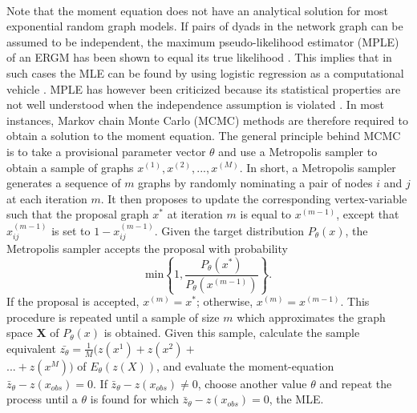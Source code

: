 \documentclass[a4paper, man, floatsintext]{apa6}
\begin{document}
\\
Note that the moment equation does not have an analytical solution for most exponential random graph models. If pairs of dyads in the network graph can be assumed to be independent, the maximum pseudo-likelihood estimator (MPLE) of an ERGM has been shown to equal its true likelihood \cite{hunter2008ergm}. This implies that in such cases the MLE can be found by using logistic regression as a computational vehicle \cite{hunter2008ergm}. MPLE has however been criticized because its statistical properties are not well understood when the independence assumption is violated \cite{van2009framework}. In most instances, Markov chain Monte Carlo (MCMC) methods are therefore required to obtain a solution to the moment equation. The general principle behind MCMC is to take a provisional parameter vector $\theta$ and use a Metropolis sampler to obtain a sample of graphs $x^{(1)}, x^{(2)}, ..., x^{(M)}$. In short, a Metropolis sampler generates a sequence of $m$ graphs by randomly nominating a pair of nodes $i$ and $j$ at each iteration $m$. It then proposes to update the corresponding vertex-variable such that the proposal graph $x^{*}$ at iteration $m$ is equal to $x^{(m−1)}$, except that $x_{ij}^{(m-1)}$ is set to $1 − x_{ij}^{(m−1)}$. Given the target distribution $P_{\theta}(x)$, the Metropolis sampler accepts the proposal with probability \begin{equation} \label{eqn:eqn5} \text{min} \left\{1, \frac{P_{\theta}(x^{*})}{P_{\theta}(x^{(m-1)})} \right\}. \end{equation} If the proposal is accepted, $x^{(m)} = x^{*}$; otherwise, $x^{(m)} = x^{(m−1)}$. This procedure is repeated until a sample of size $m$ which approximates the graph space $\textbf{X}$ of $P_{\theta}(x)$ is obtained. Given this sample, calculate the sample equivalent $\bar{z_{\theta}} = \frac{1}{M}(z(x^{1}) + z(x^{2}) + $ \\ \noindent $... + z(x^{M}))$ of $E_{\theta}(z(X))$, and evaluate the moment-equation $\bar{z}_{\theta} − z(x_{obs}) = 0$. If $\bar{z}_{\theta} − z(x_{obs}) \neq 0$, choose another value $\theta$ and repeat the process until a $\theta$ is found for which $\bar{z}_{\theta} − z(x_{obs}) = 0$, the MLE. 
\\
\end{document}
